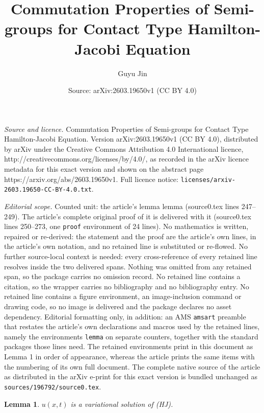 \documentclass[10pt,a4paper]{amsart}
\title{Commutation Properties of Semi-groups for Contact Type Hamilton-Jacobi Equation}
\author{Guyu Jin}
\date{Source: arXiv:2603.19650v1 (CC BY 4.0)}
\newtheorem{lemma}{Lemma}
\begin{document}
\maketitle

\noindent\emph{Source and licence.} Commutation Properties of Semi-groups for Contact Type Hamilton-Jacobi Equation. Version arXiv:2603.19650v1 (CC BY 4.0), distributed by arXiv under the Creative Commons Attribution 4.0 International licence, http://creativecommons.org/licenses/by/4.0/, as recorded in the arXiv licence metadata for this exact version and shown on the abstract page https://arxiv.org/abs/2603.19650v1. Full licence notice: \texttt{licenses/arxiv-2603.19650-CC-BY-4.0.txt}.\par\smallskip

\noindent\textit{Editorial scope.} Counted unit: the article's lemma lemma (source0.tex lines 247--249). The article's complete original proof of it is delivered with it (source0.tex lines 250--273, one \texttt{proof} environment of 24 lines). No mathematics is written, repaired or re-derived: the statement and the proof are the article's own lines, in the article's own notation, and no retained line is substituted or re-flowed.  No further source-local context is needed: every cross-reference of every retained line resolves inside the two delivered spans.  Nothing was omitted from any retained span, so the package carries no omission record.  No retained line contains a citation, so the wrapper carries no bibliography and no bibliography entry.  No retained line contains a figure environment, an image-inclusion command or drawing code, so no image is delivered and the package declares no asset dependency.  Editorial formatting only, in addition: an AMS \texttt{amsart} preamble that restates the article's own declarations and macros used by the retained lines, namely the environments \texttt{lemma} on separate counters, together with the standard packages those lines need.  The retained environments print in this document as Lemma 1 in order of appearance, whereas the article prints the same items with the numbering of its own full document.  The complete native source of the article as distributed in the arXiv e-print for this exact version is bundled unchanged as \texttt{sources/196792/source0.tex}.
\begin{lemma}
    $u(x,t)$ is a variational solution of (HJ).
\end{lemma}
\end{document}
